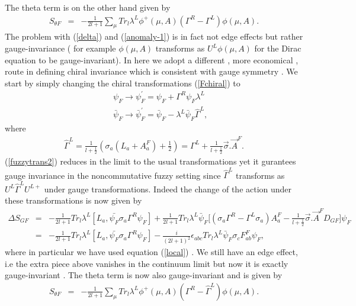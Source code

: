 \documentclass[a4paper,10pt]{article}
\begin{document}
The theta term is on the other hand given by
\begin{eqnarray}
S_{{\theta}F}&=&-\frac{1}{2l+1}\sum_{\mu}Tr_{l}{\lambda}^L{\phi}^{+}(\mu,A)({\Gamma}^R-{\Gamma}^L){\phi}(\mu,A).\label{anomaly-1}
\end{eqnarray}
The problem with (\ref{delta}) and (\ref{anomaly-1}) is in fact not edge effects but rather gauge-invariance ( for example ${\phi}(\mu , A)$ transforms as $U^L{\phi}(\mu,A)$ for the Dirac equation to be gauge-invariant). In here we adopt a different , more economical , route in
defining chiral invariance which is consistent with gauge symmetry . We start by simply changing the
chiral transformations (\ref{Fchiral}) to
\begin{eqnarray}
&&{\psi}_F{\longrightarrow}{\psi}^{'}_F={\psi}_F+{\Gamma}^{R}{\psi}_F{\lambda}^L\nonumber\\
&&\bar{\psi}_F{\longrightarrow}\bar{\psi}^{'}_F=\bar{\psi}_F-{\lambda}^L\bar{\psi}_F\hat{\Gamma}^L,\label{fuzzytrans2}
\end{eqnarray}
where
\begin{eqnarray}
\hat{\Gamma}^L=\frac{1}{l+\frac{1}{2}}({\sigma}_a(L_a+A_a^F)+\frac{1}{2})={\Gamma}^L+\frac{1}{l+\frac{1}{2}}\vec{\sigma}.\vec{A}^F.
\end{eqnarray}
(\ref{fuzzytrans2}) reduces in the limit to the usual transformations yet it gurantees gauge invariance in the noncommutative fuzzy setting since $\hat{\Gamma}^L$ transforms as $U^L\hat{\Gamma}^LU^{L+}$ under gauge transformations. Indeed the  change of the action under these transformations is now given
by
\begin{eqnarray}
{\Delta}S_{GF}&=&-\frac{1}{2l+1}Tr_{l}{\lambda}^L[L_a,\bar{{\psi}_F}{\sigma}_a{\Gamma}^R{{\psi}_F}]+\frac{1}{2l+1}Tr_l{\lambda}^L\bar{\psi}_F\bigg[({\sigma}_a{\Gamma}^R-{\Gamma}^L{\sigma}_a)A_a^F-\frac{1}{l+\frac{1}{2}}\vec{\sigma}.\vec{A}^FD_{GF}\bigg]{\psi}_F\nonumber\\
&=&-\frac{1}{2l+1}Tr_{l}{\lambda}^L[L_a,\bar{{\psi}_F}{\sigma}_a{\Gamma}^R{{\psi}_F}]-\frac{i}{(2l+1)^2}{\epsilon}_{abc}Tr_l{\lambda}^L\bar{\psi}_F{\sigma}_cF_{ab}^F{\psi}_F,
\label{divergence}
\end{eqnarray}
where in particular we have used equation (\ref{local}) . We still have an edge effect, i.e the extra piece above vanishes in the continuum limit but now it is exactly gauge-invariant . The theta term is now also gauge-invariant and is given by
\begin{eqnarray}
S_{{\theta}F}&=&-\frac{1}{2l+1}\sum_{\mu}Tr_{l}{\lambda}^L{\phi}^{+}(\mu,A)({\Gamma}^R-\hat{\Gamma}^L){\phi}(\mu,A).\label{anomaly}
\end{eqnarray}
\end{document}
